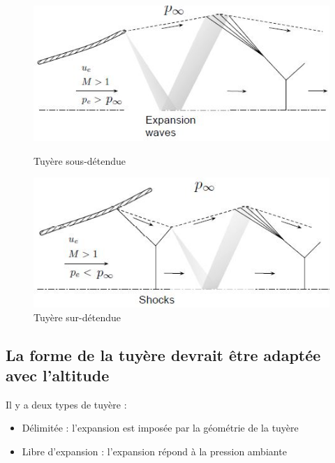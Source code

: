 \documentclass{report}
\begin{document}
\begin{figure}[h!]
\centering
\begin{minipage}{.5\textwidth}
  \centering
    \includegraphics[scale=0.6]{45.JPG}
    \caption{Tuyère sous-détendue}
    \label{45}
\end{minipage}%
\begin{minipage}{.5\textwidth}
  \centering
    \includegraphics[scale=0.6]{46.JPG}
    \caption{Tuyère sur-détendue}
    \label{46}
\end{minipage}
\end{figure}

\subsection{La forme de la tuyère devrait être adaptée avec l'altitude}

Il y a deux types de tuyère :
\begin{itemize}
    \item Délimitée : l'expansion est imposée par la géométrie de la tuyère
    \item Libre d'expansion : l'expansion répond à la pression ambiante
\end{itemize}
\end{document}
